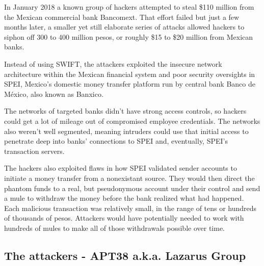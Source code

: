 \documentclass[12pt]{article}
\begin{document}
        In January 2018 a known group of hackers attempted to steal \$110 million from the Mexican commercial bank Bancomext. That effort failed but just a few months later, a smaller yet still elaborate series of attacks allowed hackers to siphon off 300 to 400 million pesos, or roughly \$15 to \$20 million from Mexican banks. 
        
        Instead of using SWIFT, the attackers exploited the insecure network architecture within the Mexican financial system and poor security oversights in SPEI, Mexico's domestic money transfer platform run by central bank Banco de México, also known as Banxico. 
        
        The networks of targeted banks didn't have strong access controls, so hackers could get a lot of mileage out of compromised employee credentials. The networks also weren't well segmented, meaning intruders could use that initial access to penetrate deep into banks' connections to SPEI and, eventually, SPEI's transaction servers. 
        
        The hackers also exploited flaws in how SPEI validated sender accounts to initiate a money transfer from a nonexistant source. They would then direct the phantom funds to a real, but pseudonymous account under their control and send a mule to withdraw the money before the bank realized what had happened. Each malicious transaction was relatively small, in the range of tens or hundreds of thousands of pesos. Attackers would have potentially needed to work with hundreds of mules to make all of those withdrawals possible over time.\cite{HowHackersPulled}
    
    \subsection{The attackers - APT38 a.k.a. Lazarus Group}
        
\end{document}
